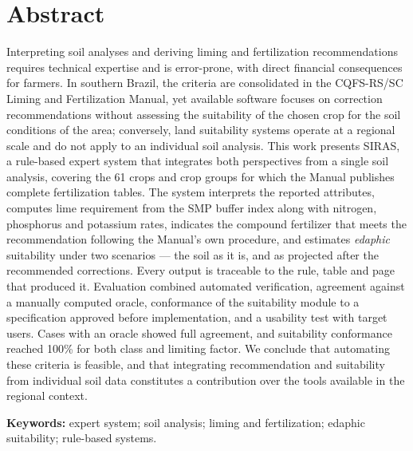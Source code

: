 \chapter*{Abstract}

Interpreting soil analyses and deriving liming and fertilization recommendations requires
technical expertise and is error-prone, with direct financial consequences for farmers.
In southern Brazil, the criteria are consolidated in the CQFS-RS/SC Liming and
Fertilization Manual, yet available software focuses on correction recommendations
without assessing the suitability of the chosen crop for the soil conditions of the
area; conversely, land suitability systems operate at a regional scale and do not apply
to an individual soil analysis. This work presents SIRAS, a rule-based expert system that
integrates both perspectives from a single soil analysis, covering the 61 crops and crop
groups for which the Manual publishes complete fertilization tables. The system
interprets the reported attributes, computes lime requirement from the SMP buffer index
along with nitrogen, phosphorus and potassium rates, indicates the compound fertilizer
that meets the recommendation following the Manual's own procedure, and estimates
\emph{edaphic} suitability under two scenarios --- the soil as it is, and as projected
after the recommended corrections. Every output is traceable to the rule, table and page
that produced it. Evaluation combined automated verification, agreement against a
manually computed oracle, conformance of the suitability module to a specification
approved before implementation, and a usability test with target users. Cases with an
oracle showed full agreement, and suitability conformance reached 100\% for both class
and limiting factor.  We conclude that
automating these criteria is feasible, and that integrating recommendation and
suitability from individual soil data constitutes a contribution over the tools available
in the regional context.

\textbf{Keywords:} expert system; soil analysis; liming and fertilization; edaphic
suitability; rule-based systems.
